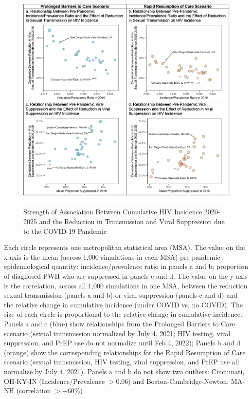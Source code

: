 \documentclass{article}
\begin{document}
\begin{figure}[H]
	\caption{Strength of Association Between Cumulative HIV Incidence 2020-2025 and the Reduction in Transmission and Viral Suppression due to the COVID-19 Pandemic}
	\includegraphics[width=\textwidth]{images/figure_s6}
\end{figure}
Each circle represents one metropolitan statistical area (MSA). The value on the x-axis is the mean (across 1,000 simulations in each MSA) pre-pandemic epidemiological quantity: incidence/prevalence ratio in panels a and b; proportion of diagnosed PWH who are suppressed in panels c and d. The value on the y-axis is the correlation, across all 1,000 simulations in one MSA, between the reduction sexual transmission (panels a and b) or viral suppression (panels c and d) and the relative change in cumulative incidence (under COVID vs. no COVID). The size of each circle is proportional to the relative change in cumulative incidence. Panels a and c (blue) show relationships from the Prolonged Barriers to Care scenario (sexual transmission normalized by July 4, 2021; HIV testing, viral suppression, and PrEP use do not normalize until Feb 4, 2022); Panels b and d (orange) show the corresponding relationships for the Rapid Resumption of Care scenario (sexual transmission, HIV testing, viral suppression, and PrEP use all normalize by July 4, 2021). Panels a and b do not show two outliers: Cincinnati, OH-KY-IN (Incidence/Prevalence $> 0.06$) and Boston-Cambridge-Newton, MA-NH (correlation $> -60$\%)
\end{document}
